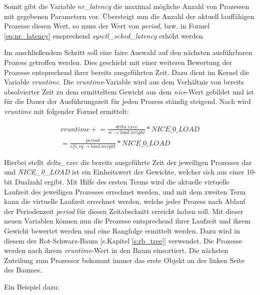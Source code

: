 Somit gibt die Variable \textit{nr\_latency} die maximal mögliche Anzahl von Prozessen mit gegebenen Parametern vor. Über\-steigt nun die Anzahl der aktuell lauffähigen Prozesse diesen Wert, so muss der Wert von \textit{period}, bzw. in Formel \ref{eq:nr_latency} ensprechend \textit{sysctl\_sched\_latency} erhöht werden.

Im anschließendem Schritt soll eine faire Auswahl auf den nächsten ausführbaren Prozess getroffen werden. Dies geschieht mit einer weiteren Bewertung der Prozesse entsprechend ihrer bereits ausgeführten Zeit. 
Dazu dient im Kernel die Variable \textit{vruntime}. Die \textit{vruntime}-Variable wird aus dem Verhältnis von bereits absolvierter Zeit zu dem ermitteltem Gewicht aus dem \textit{nice}-Wert gebildet und ist für die Dauer der Ausführungszeit für jeden Prozess ständig steigend.
Nach \cite{paperfairness} wird \textit{vruntime} mit folgender Formel ermittelt:

\begin{multline}
vruntime \mathrel{+}= \frac{delta\_exec}{se\rightarrow load.weight} * NICE\_0\_LOAD \\ = \frac{period}{cfs\_rq\rightarrow load.weight} * NICE\_0\_LOAD
\label{eq:vruntime}
\end{multline}

Hierbei stellt \textit{delta\_exec} die bereits ausgeführte Zeit der jeweiligen Prozesses dar und \textit{NICE\_0\_LOAD} ist ein Einheitswert der Gewichte, welcher sich aus einer 10-bit Dualzahl ergibt. Mit Hilfe des ersten Terms wird die aktuelle virtuelle Laufzeit des jeweiligen Prozesses errechnet werden, und mit dem zweiten Term kann die virtuelle Laufzeit errechnet werden, welche jeder Prozess nach Ablauf der Periodenzeit \textit{period} für diesen Zeitabschnitt erreicht haben soll.  
Mit dieser neuen Variablen können nun die Prozesse entsprechend ihrer Laufzeit und ihrem Gewicht bewertet werden und eine Rangfolge ermittelt werden. Dazu wird in diesem der Rot-Schwarz-Baum [s.Kapitel \ref{s:rb_tree}] verwendet. Die Prozesse werden nach ihrem \textit{vruntime}-Wert in den Baum einsortiert. Die nächsten Zuteilung zum Prozessor bekommt immer das erste Objekt an der linken Seite des Baumes.

Ein Beispiel dazu:

